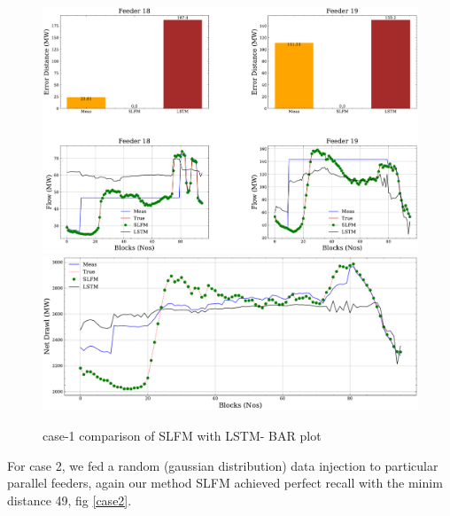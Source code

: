 \documentclass[conference]{IEEEtran}
\begin{document}
\begin{figure}[!ht]
\includegraphics[width=1\linewidth]{Test_results11.pdf}
\includegraphics[width=1\linewidth]{Test_results_full1.pdf}
\caption{case-1 comparison of SLFM with LSTM- BAR plot}
\label{case1}
\end{figure}

For case 2, we fed a random (gaussian distribution) data injection to particular parallel feeders, again our method SLFM achieved perfect recall with the minim distance 49, fig \ref{case2}.\\
\end{document}
